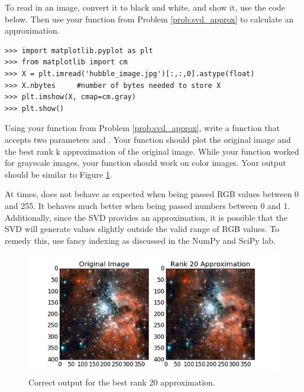 To read in an image, convert it to black and white, and show it, use the code below.
Then use your function from Problem \ref{prob:svd_approx} to calculate an approximation.
\begin{lstlisting}
>>> import matplotlib.pyplot as plt
>>> from matplotlib import cm
>>> X = plt.imread('hubble_image.jpg')[:,:,0].astype(float)
>>> X.nbytes     #number of bytes needed to store X
>>> plt.imshow(X, cmap=cm.gray)
>>> plt.show()
\end{lstlisting}

\begin{problem}
Using your  function from Problem \ref{prob:svd_approx}, write a function  that accepts two parameters  and . Your function should plot the original image and the best rank k approximation of the original image. While your  function worked for grayscale images, your  function should work on color images. Your output should be similar to Figure \ref{fig:compressed_image}.

At times,  does not behave as expected when being passed RGB values between 0 and 255. It behaves much better when being passed numbers between 0 and 1. Additionally, since the SVD provides an approximation, it is possible that the SVD will generate values slightly outside the valid range of RGB values. To remedy this, use fancy indexing as discussed in the NumPy and SciPy lab. 

\begin{figure}[H]
\includegraphics[width=\textwidth]{compressed.jpg}
\caption{Correct output for the best rank 20 approximation.}
\label{fig:compressed_image}
\end{figure}
\end{problem}
